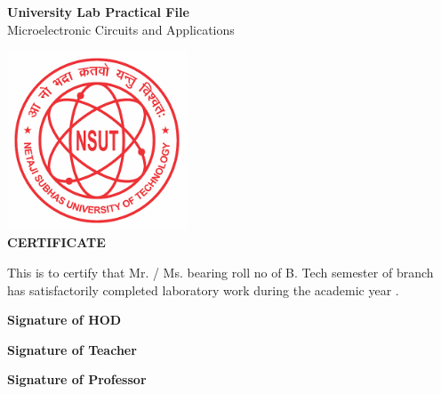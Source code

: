 \documentclass[a4paper,12pt]{report}
\begin{document}
\setcounter{tocdepth}{1}

\begin{titlepage}
    \centering
    \vspace*{1cm}

    \Huge
    \textbf{University Lab Practical File}\\
    Microelectronic Circuits and Applications
    \newpage 

    \includegraphics[width=0.4\textwidth]{../Img/NSUT_logo.png}\\[1.5em]
    {\Huge \textbf{CERTIFICATE}}

    \vspace{2cm}

    \raggedright
    \begin{spacing}{1.5}
    \large This is to certify that Mr. / Ms. \underline{\hspace{6cm}} bearing roll no \underline{\hspace{10cm}} of B. Tech \underline{\hspace{4cm}} semester \underline{\hspace{2cm}} of branch \underline{\hspace{8cm}} has satisfactorily completed \underline{\hspace{12cm}} laboratory work during the academic year \underline{\hspace{8cm}}.
    \end{spacing}

    \vfill

    \large
    \noindent
    \begin{minipage}[t]{0.2\textwidth}
        \textbf{Signature of HOD} \\
    \end{minipage}%
    \hfill
    \begin{minipage}[t]{0.2\textwidth}
        \textbf{Signature of Teacher} \\
    \end{minipage}%
    \hfill
    \begin{minipage}[t]{0.2\textwidth}
        \textbf{Signature of Professor} \\
    \end{minipage}


\end{titlepage}
\end{document}
